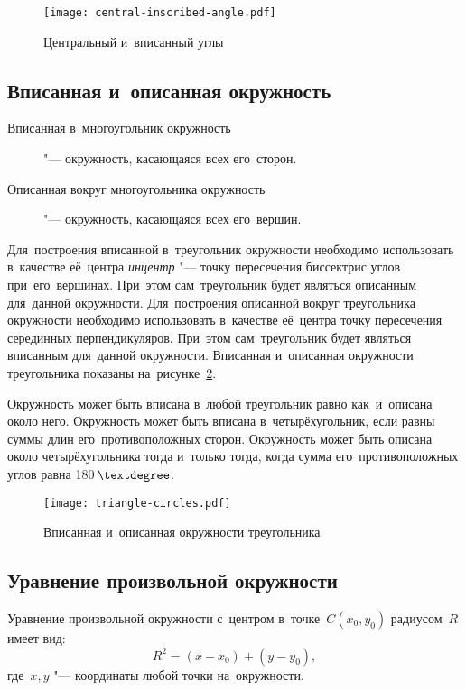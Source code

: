 \documentclass[]{scrartcl}
\begin{document}
\begin{figure}[ht]
	\centering %
	\texttt{[image: central-inscribed-angle.pdf]}
	\caption{Центральный и~вписанный углы}\label{fig:central-inscribed-angle}
\end{figure}

\subsection{Вписанная и~описанная окружность}
\begin{description}
	\item[Вписанная в~многоугольник окружность] "--- окружность, касающаяся всех его~сторон.
\end{description}
\begin{description}
	\item[Описанная вокруг многоугольника окружность] "--- окружность, касающаяся всех его~вершин.
\end{description}
Для~построения вписанной в~треугольник окружности необходимо использовать в~качестве её~центра \emph{инцентр} "--- точку пересечения биссектрис углов при~его~вершинах. При~этом сам~треугольник будет являться описанным для~данной окружности. Для~построения описанной вокруг треугольника окружности необходимо использовать в~качестве её~центра  точку пересечения серединных перпендикуляров. При~этом сам~треугольник будет являться вписанным для~данной окружности. Вписанная и~описанная окружности треугольника показаны на~рисунке~\ref{fig:triangle-circles}.

Окружность может быть вписана в~любой треугольник равно как~и~описана около него. Окружность может быть вписана в~четырёхугольник, если равны суммы длин его~противоположных сторон. Окружность может быть описана около четырёхугольника тогда и~только тогда, когда сумма его~противоположных углов равна 180\,$\textdegree$.

\begin{figure}[ht]
\centering %
\texttt{[image: triangle-circles.pdf]}
\caption{Вписанная и~описанная окружности треугольника}\label{fig:triangle-circles}
\end{figure}

\subsection{Уравнение произвольной окружности}
Уравнение произвольной окружности с~центром в~точке~${\textstyle C(x_0,y_0)}$ радиусом~${\textstyle R}$ имеет вид:
\begin{equation}\label{eq:circle-equation-2}
R^2=(x-x_0)+(y-y_0),
\end{equation}
где~${\textstyle x,y}$ "--- координаты любой точки на~окружности.
\end{document}
